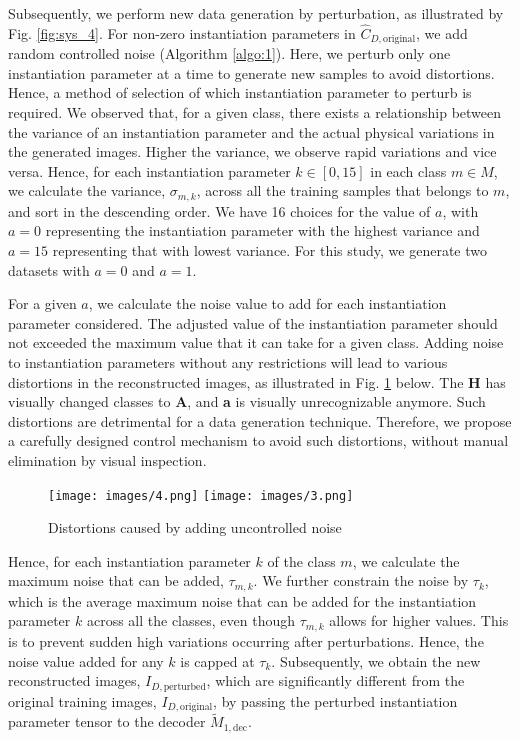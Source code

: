 Subsequently, we perform new data generation by perturbation, as illustrated by Fig. \ref{fig:sys_4}. For non-zero instantiation parameters in $\widehat{C}_{D,\mathrm{original}}$, we add random controlled noise (Algorithm \ref{algo:1}). Here, we perturb only one instantiation parameter at a time to generate new samples to avoid distortions. Hence, a method of selection of which instantiation parameter to perturb is required. We observed that, for a given class, there exists a relationship between the variance of an instantiation parameter and the actual physical variations in the generated images. Higher the variance, we observe rapid variations and vice versa. Hence, for each instantiation parameter $k \in [0,15]$ in each class $m \in M$, we calculate the variance, $\sigma_{m,k}$, across all the training samples that belongs to $m$, and sort in the descending order. We have 16 choices for the value of $a$, with $a=0$ representing the instantiation parameter with the highest variance and $a=15$ representing that with lowest variance. For this study, we generate two datasets with $a=0$ and $a=1$.

For a given $a$, we calculate the noise value to add for each instantiation parameter considered. The adjusted value of the instantiation parameter should not exceeded the maximum value that it can take for a given class. Adding noise to instantiation parameters without any restrictions will lead to various distortions in the reconstructed images, as illustrated in Fig. \ref{fig:too_much} below. The \textbf{H} has visually changed classes to \textbf{A}, and \textbf{a} is visually unrecognizable anymore. Such distortions are detrimental for a data generation technique. Therefore, we propose a carefully designed control mechanism to avoid such distortions, without manual elimination by visual inspection. 

\begin{figure}[!h]
\vspace{-2mm}
    \centering
    \texttt{[image: images/4.png]}
    \texttt{[image: images/3.png]}
    \caption{Distortions caused by adding uncontrolled noise}
    \label{fig:too_much}
    \vspace{-3mm}
\end{figure}

Hence, for each instantiation parameter $k$ of the class $m$, we calculate the maximum noise that can be added, $\tau_{m,k}$. We further constrain the noise by $\tau_{k}$, which is the average maximum noise that can be added for the instantiation parameter $k$ across all the classes, even though $\tau_{m,k}$ allows for higher values. This is to prevent sudden high variations occurring after perturbations. Hence, the noise value added for any $k$ is capped at $\tau_{k}$. Subsequently, we obtain the new reconstructed images, $I_{D,\mathrm{perturbed}}$, which are significantly different from the original training images, $I_{D,\mathrm{original}}$, by passing the perturbed instantiation parameter tensor to the decoder $\widetilde{M}_{1,\mathrm{dec}}$.


